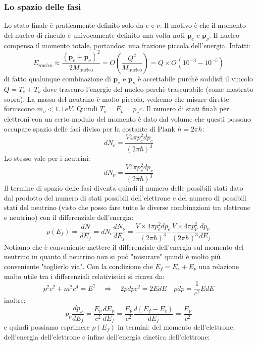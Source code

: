 \subsubsection{Lo spazio delle fasi}
Lo stato finale è praticamente definito solo da $e$ e $\nu$. Il motivo è che il momento del nucleo di rinculo è univocamente definito una volta noti $\mathbf{p}_e$ e $\mathbf{p}_\nu$. Il nucleo compensa il momento totale, portandosi una frazione piccola dell'energia. Infatti:
\begin{equation*}
    E_{nucleo}\approx\frac{(\mathbf{p}_e+\mathbf{p}_\nu)^2}{2M_{\text{nucleo}}}=O\left(\frac{Q^2}{M_{\text{nucleo}}}\right)=Q\times O(10^{-3}-10^{-5})
\end{equation*}
di fatto qualunque combinazione di $\mathbf{p}_e$ e $\mathbf{p}_\nu$ è accettabile purchè soddisfi il vincolo $Q=T_e+T_\nu$ dove trascuro l'energie del nucleo perchè trascurabile (come mostrato sopra). La massa del neutrino è molto piccola, vedremo che misure dirette forniscono $m_\nu<1.1\,eV$. Quindi $T_\nu=E_\nu=p_\nu c$. Il numero di stati finali per elettroni con un certo modulo del momento è dato dal volume che questi possono occupare spazio delle fasi diviso per la costante di Plank $h=2\pi\hbar$:
\begin{equation*}
    dN_e=\frac{V4\pi p_e^2dp_e}{(2\pi \hbar)^3}
\end{equation*}
Lo stesso vale per i neutrini:
\begin{equation*}
    dN_\nu=\frac{V4\pi p_\nu^2dp_\nu}{(2\pi \hbar)^3}
\end{equation*}
Il termine di spazio delle fasi diventa quindi il numero delle possibili stati dato dal prodotto del numero di stati possibili dell'elettrone e del numero di possibili stati del neutrino (visto che posso fare tutte le diverse combinazioni tra elettrone e neutrino) con il differenziale dell'energia:
\begin{equation*}
    \rho(E_f)=\frac{dN}{dE_f}=dN_e\frac{dN_\nu}{dE_f}=\frac{V\times4\pi p_e^2dp_e}{(2\pi\hbar)^3}\frac{V\times4\pi p_\nu^2}{(2\pi\hbar)^3}\frac{dp_\nu}{dE_f}
\end{equation*}
Notiamo che è conveniente mettere il differenziale dell'energia sul momento del neutrino in quanto il neutrino non si può "misurare" quindi è molto più conveniente "toglierlo via". 
Con la condizione che $E_f=E_e+E_\nu$ una relazione molto utile tra i differenziali relativistici si ricava da:
\begin{equation*}
    p^2c^2+m^2c^4=E^2\quad \Rightarrow\quad 2pdpc^2=2EdE \quad pdp=\frac{1}{c^2}EdE
\end{equation*}
inoltre:
\begin{equation*}
    p_\nu \frac{d p_\nu}{d E_f}=\frac{E_\nu}{c^2} \frac{d E_\nu}{d E_f}=\frac{E_\nu}{c^2} \frac{d\left(E_f-E_e\right)}{d E_f}=\frac{E_\nu}{c^2}
\end{equation*}
e quindi possiamo esprimere $\rho(E_f)$ in termini: del momento dell'elettrone, dell'energia dell'elettrone e infine dell'energia cinetica dell'elettrone:

